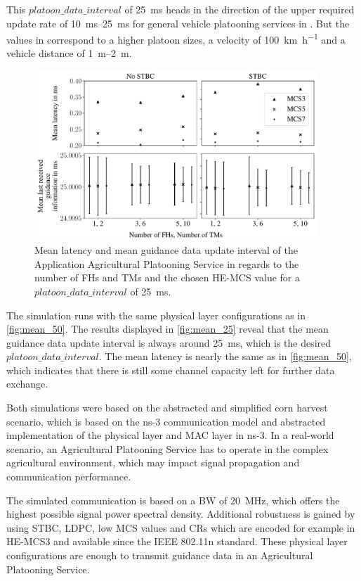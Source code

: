 This $platoon\_data\_interval$ of \SI{25}{\milli\second} heads in the direction of the upper required update rate of \SIrange{10}{25}{\milli\second} for general
vehicle platooning services in \cite{TR-22.886}.
But the values in \cite{TR-22.886} correspond to a higher platoon sizes, a velocity of \SI{100}{\kilo\meter\per\hour} and a
vehicle distance of \SIrange{1}{2}{\metre}.


\begin{figure}[]%
   \centering
   \includegraphics[width=0.95\textwidth]{figures/latency_lastUpdate25ms}
   \caption{Mean latency and mean guidance data update interval of the Application Agricultural Platooning Service in regards to the number of \ac{FH}s and \ac{TM}s and
   the chosen \ac{HE}-\ac{MCS} value for a $platoon\_data\_interval$ of \SI{25}{\milli\second}.}
   \label{fig:mean_25}%
\end{figure}

The simulation runs with the same physical layer configurations as in \autoref{fig:mean_50}.
The results displayed in \autoref{fig:mean_25} reveal that the mean guidance data update interval is always around \SI{25}{\milli\second},
which is the desired $platoon\_data\_interval$.
The mean latency is nearly the same as in \autoref{fig:mean_50}, which indicates that there is still some channel capacity left for
further data exchange.

Both simulations were based on the abstracted and simplified corn harvest scenario, which is based on the ns-3 communication model and
abstracted implementation of the physical layer and MAC layer in ns-3.
In a real-world scenario, an Agricultural Platooning Service has to operate in the complex agricultural environment, which
may impact signal propagation and communication performance.

The simulated communication is based on a \ac{BW} of \SI{20}{\mega\hertz}, which offers the highest possible signal power spectral density.
Additional robustness is gained by using \ac{STBC}, \ac{LDPC}, low \ac{MCS} values and \ac{CR}s which are encoded for example in
\ac{HE}-\ac{MCS}3 and available since the IEEE 802.11n standard.
These physical layer configurations are enough to transmit guidance data in an Agricultural Platooning Service.

